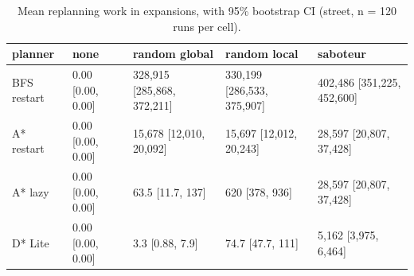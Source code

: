 \begin{table}[t]
\centering
\small
\caption{Mean replanning work in expansions, with 95\% bootstrap CI (street, n = 120 runs per cell).}
\label{tab:replan-street}
\begin{tabular}{lllll}
\toprule
planner & none & random global & random local & saboteur \\
\midrule
BFS restart & 0.00 [0.00, 0.00] & 328,915 [285,868, 372,211] & 330,199 [286,533, 375,907] & 402,486 [351,225, 452,600] \\
A* restart & 0.00 [0.00, 0.00] & 15,678 [12,010, 20,092] & 15,697 [12,012, 20,243] & 28,597 [20,807, 37,428] \\
A* lazy & 0.00 [0.00, 0.00] & 63.5 [11.7, 137] & 620 [378, 936] & 28,597 [20,807, 37,428] \\
D* Lite & 0.00 [0.00, 0.00] & 3.3 [0.88, 7.9] & 74.7 [47.7, 111] & 5,162 [3,975, 6,464] \\
\bottomrule
\end{tabular}
\end{table}
